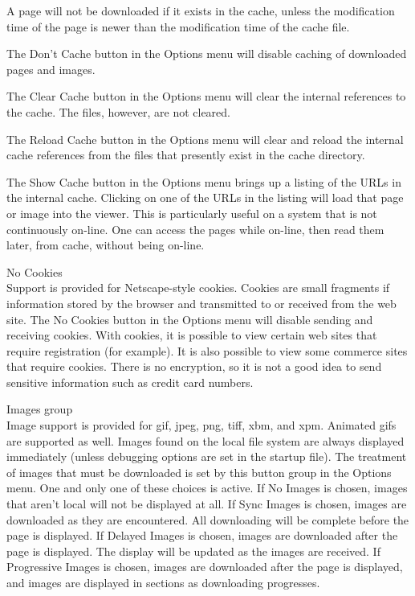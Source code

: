 \begin{description}
A page will not be downloaded if it exists in the cache, unless the
modification time of the page is newer than the modification time of
the cache file.

The {\cb Don't Cache} button in the {\cb Options} menu will disable
caching of downloaded pages and images.

The {\cb Clear Cache} button in the {\cb Options} menu will clear the
internal references to the cache.  The files, however, are not cleared.

The {\cb Reload Cache} button in the {\cb Options} menu will clear and
reload the internal cache references from the files that presently
exist in the cache directory.

The {\cb Show Cache} button in the {\cb Options} menu brings up a
listing of the URLs in the internal cache.  Clicking on one of the
URLs in the listing will load that page or image into the viewer. 
This is particularly useful on a system that is not continuously
on-line.  One can access the pages while on-line, then read them
later, from cache, without being on-line.

\item{\cb No Cookies}\\
Support is provided for Netscape-style cookies.  Cookies are small
fragments if information stored by the browser and transmitted to or
received from the web site.  The {\cb No Cookies} button in the {\cb
Options} menu will disable sending and receiving cookies.  With
cookies, it is possible to view certain web sites that require
registration (for example).  It is also possible to view some commerce
sites that require cookies.  There is no encryption, so it is not a
good idea to send sensitive information such as credit card numbers.

\item{\cb Images} group\\
Image support is provided for gif, jpeg, png, tiff, xbm, and xpm. 
Animated gifs are supported as well.  Images found on the local file
system are always displayed immediately (unless debugging options are
set in the startup file).  The treatment of images that must be
downloaded is set by this button group in the {\cb Options} menu.  One
and only one of these choices is active.  If {\cb No Images} is
chosen, images that aren't local will not be displayed at all.  If
{\cb Sync Images} is chosen, images are downloaded as they are
encountered.  All downloading will be complete before the page is
displayed.  If {\cb Delayed Images} is chosen, images are downloaded
after the page is displayed.  The display will be updated as the
images are received.  If {\cb Progressive Images} is chosen, images
are downloaded after the page is displayed, and images are displayed
in sections as downloading progresses.


\end{description}

